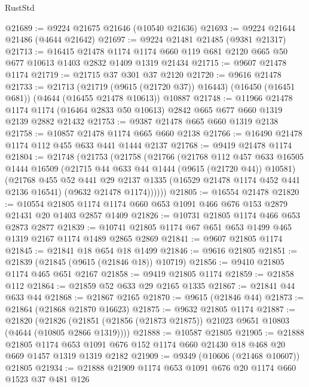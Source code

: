 \begin{lexlean}{RustStd}
\begin{coremodule}
@21689 := @9224 @21675 @21646 (@10540 @21636)
@21693 := @9224 @21644 @21486 (@4644 @21642)
@21697 := @9224 @21481 @21485 (@9381 @21317)
@21713 := @16415
    @21478
    @1174
    @1174
    @660
    @119
    @681
    @2120
    @665
    @50
    @677
    @10613
    @1403
    @2832
    @1409
    @1319
    @21434
@21715 := @9607 @21478 @1174
@21719 := @21715 @37 @301 @37 @2120
@21720 := @9616 @21478
@21733 := @21713
    (@21719 (@9615 (@21720 @37)) @16443)
    (@16450 (@16451 @681))
    (@4644 (@16455 @21478 @10613))
    @10887
@21748 := @11966
    @21478
    @1174
    @1174
    (@16464 @2833 @50 @10613)
    @2842
    @665
    @677
    @660
    @1319
    @2139
    @2882
    @21432
@21753 := @9387 @21478 @665 @660 @1319 @2138
@21758 := @10857 @21478 @1174 @665 @660 @2138
@21766 := @16490 @21478 @1174 @112 @455 @633 @441 @1444 @2137
@21768 := @9419 @21478 @1174
@21804 := @21748
    (@21753
      (@21758
        (@21766
          (@21768
            @112
            @457
            @633
            @16505
            @1444
            @16509
            (@21715 @44 @633 @44 @1444 (@9615 (@21720 @44)) @10581)
            (@21768
              @455
              @52
              @441
              @29
              @2137
              @1335
              (@16529 @21478 @1174 @452 @441 @2136 @16541)
              (@9632 @21478 @1174))))))
@21805 := @16554 @21478
@21820 := @10554
    @21805
    @1174
    @1174
    @660
    @653
    @1091
    @466
    @676
    @153
    @2879
    @21431
    @20
    @1403
    @2857
    @1409
@21826 := @10731 @21805 @1174 @466 @653 @2873 @2877
@21839 := @10741 @21805 @1174 @67 @651 @653 @1499 @465 @1319 @2167 @1174 @1489 @2865 @2869
@21841 := @9607 @21805 @1174
@21845 := @21841 @18 @654 @18 @1499
@21846 := @9616 @21805
@21851 := @21839 (@21845 (@9615 (@21846 @18)) @10719)
@21856 := @9410 @21805 @1174 @465 @651 @2167
@21858 := @9419 @21805 @1174
@21859 := @21858 @112
@21864 := @21859 @52 @633 @29 @2165 @1335
@21867 := @21841 @44 @633 @44
@21868 := @21867 @2165
@21870 := @9615 (@21846 @44)
@21873 := @21864 (@21868 @21870 @16623)
@21875 := @9632 @21805 @1174
@21887 := @21820
    (@21826 (@21851 (@21856 (@21873 @21875)) @21023 @9651 @10803 (@4644 (@10805 @2866 @1319))))
@21888 := @10587 @21805
@21905 := @21888
    @21805
    @1174
    @653
    @1091
    @676
    @152
    @1174
    @660
    @21430
    @18
    @468
    @20
    @669
    @1457
    @1319
    @1319
    @2182
@21909 := @9349 (@10606 (@21468 @10607)) @21805
@21934 := @21888
    @21909
    @1174
    @653
    @1091
    @676
    @20
    @1174
    @660
    @1523
    @37
    @481
    @126

\end{coremodule}
\end{lexlean}
